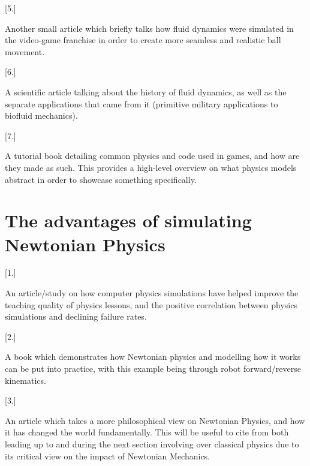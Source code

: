 \documentclass[12pt]{article}
\begin{document}
[5.] \parencite{fifa_air_resistance} \par Another small article which briefly talks how fluid dynamics were simulated in the video-game franchise
 in order to create more seamless and realistic ball movement.

[6.] \parencite{fluid_dynamic_workings} \par A scientific article talking about the history of fluid dynamics, as well as the separate applications
that came from it (primitive military applications to biofluid mechanics). 

[7.] \parencite{game_physics} \par A tutorial book detailing common physics and code used in games, and how are they made as such.
This provides a high-level overview on what physics models abstract in order to showcase something specifically. 

\section{The advantages of simulating Newtonian Physics}

[1.] \parencite{physics_learning} \par An article/study on how computer physics simulations have helped
improve the teaching quality of physics lessons, and the positive correlation between physics simulations and declining failure rates. 

[2.] \parencite{robot_kinematics} \par A book which demonstrates how Newtonian physics and modelling how it works can be put into practice,
with this example being through robot forward/reverse kinematics.

[3.] \parencite{newtonian_synthesis} \par An article which takes a more philosophical view on Newtonian Physics, and how it has changed the world fundamentally.
This will be useful to cite from both leading up to and during the next section involving  over classical physics due to its critical view on the impact
of Newtonian Mechanics.

\newpage


\printbibliography
\end{document}

